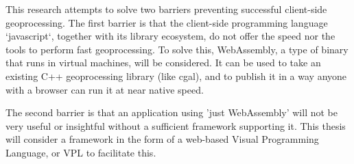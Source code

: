 This research attempts to solve two barriers preventing successful client-side geoprocessing. The first barrier is that the client-side programming language `javascript`, together with its library ecosystem, do not offer the speed nor the tools to perform fast geoprocessing. To solve this, WebAssembly, a type of binary that runs in virtual machines, will be considered. It can be used to take an existing C++ geoprocessing library (like cgal), and to publish it in a way anyone with a browser can run it at near native speed. 

The second barrier is that an application using 'just WebAssembly' will not be very useful or insightful without a sufficient framework supporting it. This thesis will consider a framework in the form of a web-based Visual Programming Language, or VPL to facilitate this. 